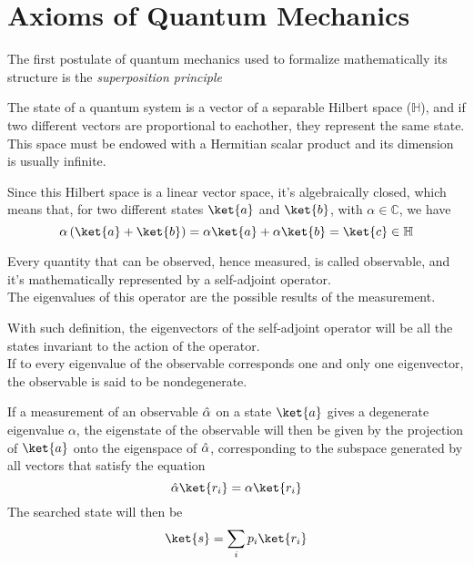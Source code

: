 \documentclass[../qm.tex]{subfiles}
\begin{document}
	\section{Axioms of Quantum Mechanics}
	The first postulate of quantum mechanics used to formalize mathematically its structure is the \textit{superposition principle}
	\begin{pos}
		The state of a quantum system is a vector of a separable Hilbert space ($\mathbb{H}$), and if two different vectors are proportional to eachother, they represent the same state. This space must be endowed with a Hermitian scalar product and its dimension is usually infinite.
	\end{pos}
	Since this Hilbert space is a linear vector space, it's algebraically closed, which means that, for two different states $\ket{a}$ and $\ket{b}$, with $\alpha\in\mathbb{C}$, we have
	\begin{equation}
		\alpha\left( \ket{a}+\ket{b} \right)=\alpha\ket{a}+\alpha\ket{b}=\ket{c}\in\mathbb{H}
		\label{eq:algebraiclosed}
	\end{equation}
	\begin{pos}[Observables]
		Every quantity that can be observed, hence measured, is called observable, and it's mathematically represented by a self-adjoint operator.\\
		The eigenvalues of this operator are the possible results of the measurement.
	\end{pos}
	With such definition, the eigenvectors of the self-adjoint operator will be all the states invariant to the action of the operator.\\
	If to every eigenvalue of the observable corresponds one and only one eigenvector, the observable is said to be nondegenerate.
	\begin{pos}
		If a measurement of an observable $\hat{\alpha}$ on a state $\ket{a}$ gives a degenerate eigenvalue $\alpha$, the eigenstate of the observable will then be given by the projection of $\ket{a}$ onto the eigenspace of $\hat{\alpha}$, corresponding to the subspace generated by all vectors that satisfy the equation
		\begin{equation*}
			\opr{\alpha}\ket{r_i}=\alpha\ket{r_i}
		\end{equation*}
		The searched state will then be
		\begin{equation*}
			\ket{s}=\sum_ip_i\ket{r_i}
		\end{equation*}
	\end{pos}
\end{document}
